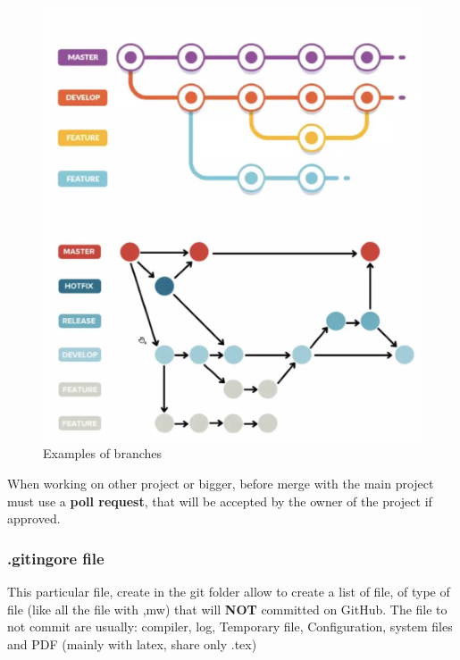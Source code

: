 \documentclass{report}
\begin{document}
\begin{figure} [H]
    \centering
    \begin{minipage}{0.4\textwidth}
        \centering
        \includegraphics[scale=0.32]{img/branches.jpg}
    \end{minipage}
    \hfill
    \begin{minipage}{0.4\textwidth}
        \centering
        \includegraphics[scale=0.32]{img/branches2.jpg}
    \end{minipage}    
    \caption{Examples of branches}
    \label{branch}
\end{figure}
When working on other project or bigger, before merge with the main project must use a \textbf{poll request}, that will be accepted by the owner of the project if approved.




\subsubsection{.gitingore file}
This particular file, create in the git folder allow to create a list of file, of type of file (like all the file with ,mw) that will \textbf{NOT} committed on GitHub. 
The file to not commit are usually: compiler, log, Temporary file, Configuration, system files and PDF (mainly with latex, share only .tex)
\end{document}
